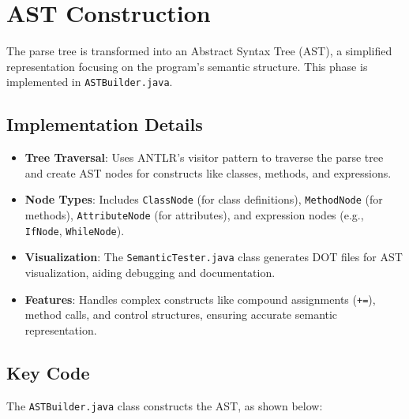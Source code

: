 \documentclass[12pt]{article}
\begin{document}
\section{AST Construction}
The parse tree is transformed into an Abstract Syntax Tree (AST), a simplified representation focusing on the program’s semantic structure. This phase is implemented in \texttt{ASTBuilder.java}.

\subsection{Implementation Details}
\begin{itemize}[itemsep=2pt]
    \item \textbf{Tree Traversal}: Uses ANTLR’s visitor pattern to traverse the parse tree and create AST nodes for constructs like classes, methods, and expressions.
    \item \textbf{Node Types}: Includes \texttt{ClassNode} (for class definitions), \texttt{MethodNode} (for methods), \texttt{AttributeNode} (for attributes), and expression nodes (e.g., \texttt{IfNode}, \texttt{WhileNode}).
    \item \textbf{Visualization}: The \texttt{SemanticTester.java} class generates DOT files for AST visualization, aiding debugging and documentation.
    \item \textbf{Features}: Handles complex constructs like compound assignments (\texttt{+=}), method calls, and control structures, ensuring accurate semantic representation.
\end{itemize}

\subsection{Key Code}
The \texttt{ASTBuilder.java} class constructs the AST, as shown below:
\end{document}
